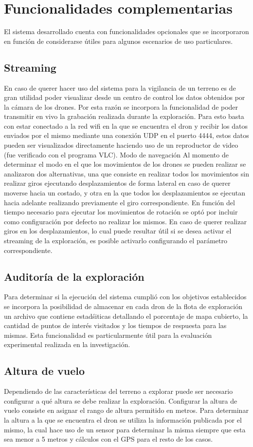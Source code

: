 \section{Funcionalidades complementarias}
El sistema desarrollado cuenta con funcionalidades opcionales que se incorporaron en función de considerarse útiles para algunos escenarios de uso particulares.
\subsection{Streaming}
En caso de querer hacer uso del sistema para la vigilancia de un terreno es de gran utilidad poder visualizar desde un centro de control los datos obtenidos por la cámara de los drones.
Por esta razón se incorpora la funcionalidad de poder transmitir en vivo la grabación realizada durante la exploración. Para esto basta con estar conectado a la red wifi en la que se encuentra el dron y recibir los datos enviados por el mismo mediante una conexión UDP en el puerto 4444, estos datos pueden ser visualizados directamente haciendo uso de un reproductor de video (fue verificado con el programa VLC).
Modo de navegación
Al momento de determinar el modo en el que los movimientos de los drones se pueden realizar se analizaron dos alternativas, una que consiste en realizar todos los movimientos sin realizar giros ejecutando desplazamientos de forma lateral en caso de querer moverse hacia un costado, y otra en la que todos los desplazamientos se ejecutan hacia adelante realizando previamente el giro correspondiente.
En función del tiempo necesario para ejecutar los movimientos de rotación se optó por incluir como configuración por defecto no realizar los mismos.
En caso de querer realizar giros en los desplazamientos, lo cual puede resultar útil si se desea activar el streaming de la exploración, es posible activarlo configurando el parámetro correspondiente.

\subsection{Auditoría de la exploración}
Para determinar si la ejecución del sistema cumplió con los objetivos establecidos se incorpora la posibilidad de almacenar en cada dron de la flota de exploración un archivo que contiene estadśiticas detallando el porcentaje de mapa cubierto, la cantidad de puntos de interés visitados y los tiempos de respuesta para las mismas. 
Esta funcionalidad es particularmente útil para la evaluación experimental realizada en la investigación.
\subsection{Altura de vuelo}
Dependiendo de las características del terreno a explorar puede ser necesario configurar a qué altura se debe realizar la exploración. Configurar la altura de vuelo consiste en asignar el rango de altura permitido en metros.
Para determinar la altura a la que se encuentra el dron se utiliza la información publicada por el mismo, la cual hace uso de un sensor para determinar la misma siempre que esta sea menor a 5 metros y cálculos con el GPS para el resto de los casos. 
